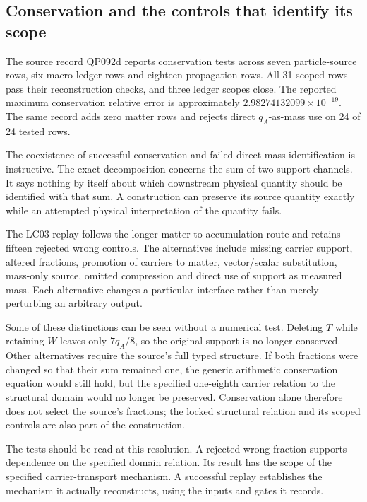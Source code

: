\subsection{Conservation and the controls that identify its scope}

The source record QP092d reports conservation tests across seven particle-source rows, six macro-ledger rows and eighteen propagation rows. All 31 scoped rows pass their reconstruction checks, and three ledger scopes close. The reported maximum conservation relative error is approximately $2.98274132099\times10^{-19}$. The same record adds zero matter rows and rejects direct $q_A$-as-mass use on 24 of 24 tested rows.\cite{viireview}

The coexistence of successful conservation and failed direct mass identification is instructive. The exact decomposition concerns the sum of two support channels. It says nothing by itself about which downstream physical quantity should be identified with that sum. A construction can preserve its source quantity exactly while an attempted physical interpretation of the quantity fails.

The LC03 replay follows the longer matter-to-accumulation route and retains fifteen rejected wrong controls. The alternatives include missing carrier support, altered fractions, promotion of carriers to matter, vector/scalar substitution, mass-only source, omitted compression and direct use of support as measured mass. Each alternative changes a particular interface rather than merely perturbing an arbitrary output.

Some of these distinctions can be seen without a numerical test. Deleting $T$ while retaining $W$ leaves only $7q_A/8$, so the original support is no longer conserved. Other alternatives require the source's full typed structure. If both fractions were changed so that their sum remained one, the generic arithmetic conservation equation would still hold, but the specified one-eighth carrier relation to the structural domain would no longer be preserved. Conservation alone therefore does not select the source's fractions; the locked structural relation and its scoped controls are also part of the construction.

The tests should be read at this resolution. A rejected wrong fraction supports dependence on the specified domain relation. Its result has the scope of the specified carrier-transport mechanism. A successful replay establishes the mechanism it actually reconstructs, using the inputs and gates it records.

